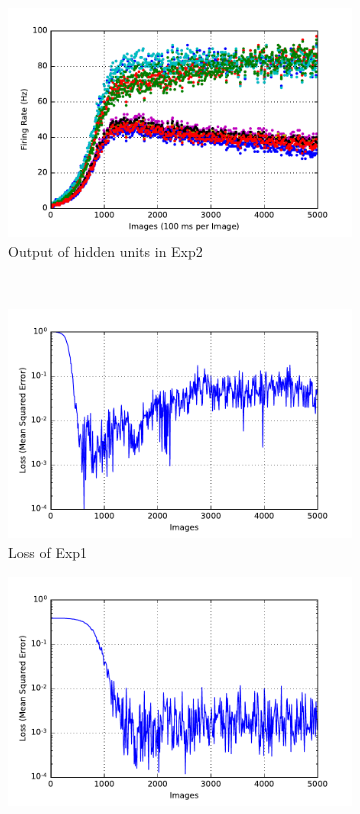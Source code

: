 \begin{figure}
\begin{subfigure}[t]{0.4\textwidth}
		\includegraphics[width=\textwidth]{pics_sdlm/11_exp_SRBM_Orig_long/exp2_hid_s.pdf}
		\caption{Output of hidden units in Exp2}
	\end{subfigure}\\
	\begin{subfigure}[t]{0.4\textwidth}
		\includegraphics[width=\textwidth]{pics_sdlm/11_exp_SRBM_Orig_long/exp1_mse_nons.pdf}
		\caption{Loss of Exp1}
	\end{subfigure}
	\begin{subfigure}[t]{0.4\textwidth}
		\includegraphics[width=\textwidth]{pics_sdlm/11_exp_SRBM_Orig_long/exp2_mse_nons.pdf}

\end{subfigure}
\end{figure}
